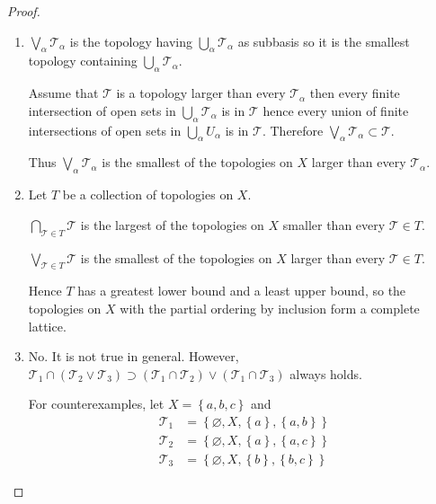 \begin{proof}
	\begin{enumerate}[label={(\alph*)}]
		\item \(\bigvee_\alpha \mathscr{T}_\alpha\) is the topology having \(\bigcup_\alpha \mathscr{T}_\alpha\) as subbasis so it is the smallest topology containing \(\bigcup_\alpha \mathscr{T}_\alpha\).

		      Assume that \( \mathscr{T} \) is a topology larger than every \( \mathscr{T}_{\alpha} \) then every finite intersection of open sets in \( \bigcup_{\alpha}\mathscr{T}_{\alpha} \) is in \( \mathscr{T} \) hence every union of finite intersections of open sets in \( \bigcup_{\alpha} U_{\alpha} \) is in \( \mathscr{T} \). Therefore \( \bigvee_\alpha \mathscr{T}_\alpha \subset \mathscr{T} \).

		      Thus \( \bigvee_\alpha \mathscr{T}_\alpha \) is the smallest of the topologies on \(X\) larger than every \( \mathscr{T}_{\alpha} \).
		\item Let \( T \) be a collection of topologies on \( X \).

		      \( \bigcap_{\mathscr{T} \in T} \mathscr{T} \) is the largest of the topologies on \( X \) smaller than every \( \mathscr{T} \in T \).

		      \( \bigvee_{\mathscr{T} \in T} \mathscr{T} \) is the smallest of the topologies on \( X \) larger than every \( \mathscr{T} \in T \).

		      Hence \( T \) has a greatest lower bound and a least upper bound, so the topologies on \(X\) with the partial ordering by inclusion form a complete lattice.
		\item No. It is not true in general. However, \( \mathscr{T}_{1} \cap (\mathscr{T}_{2} \vee \mathscr{T}_{3}) \supset (\mathscr{T}_{1} \cap \mathscr{T}_{2}) \vee (\mathscr{T}_{1} \cap \mathscr{T}_{3}) \) always holds.

		      For counterexamples, let \( X = \left\{ a, b, c \right\} \) and
		      \begingroup
		      \allowdisplaybreaks%
		      \begin{align*}
			      \mathscr{T}_{1} & = \left\{ \varnothing, X, \left\{ a \right\}, \left\{ a, b \right\} \right\} \\
			      \mathscr{T}_{2} & = \left\{ \varnothing, X, \left\{ a \right\}, \left\{ a, c \right\} \right\} \\
			      \mathscr{T}_{3} & = \left\{ \varnothing, X, \left\{ b \right\}, \left\{ b, c \right\} \right\}
		      \end{align*}
		      \endgroup


\end{enumerate}
\end{proof}
